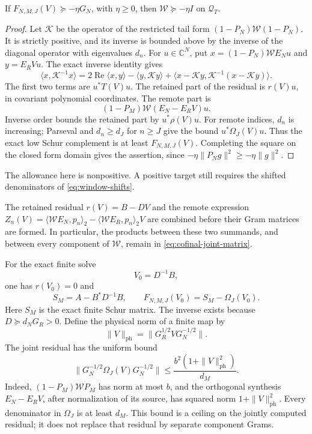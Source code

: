 \begin{proposition}\label{prop:cofinal-joint}
If $F_{N,M,J}(V)\succeq-\eta G_N$, with $\eta\ge0$, then
$\mathcal W\succeq-\eta I$ on $\mathcal Q_T$.
\end{proposition}

\begin{proof}
Let $\mathcal K$ be the operator of the restricted tail form
$(1-P_N)\mathcal W(1-P_N)$.  It is strictly positive, and its inverse
is bounded above by the inverse of the diagonal operator with
eigenvalues $d_n$. For $u\in\mathbb C^N$, put
$x=(1-P_N)\mathcal WE_Nu$ and $y=E_RVu$.
The exact inverse identity gives
\[
 \langle x,\mathcal K^{-1}x\rangle
 =2\operatorname{Re}\langle x,y\rangle-\langle y,\mathcal Ky\rangle
 +\langle x-\mathcal Ky,\mathcal K^{-1}(x-\mathcal Ky)\rangle.
\]
The first two terms are $u^*T(V)u$. The retained part of the
residual is $r(V)u$, in covariant polynomial coordinates.
The remote part is
\[
 (1-P_M)\mathcal W(E_N-E_RV)u.
\]
Inverse order bounds the retained part by $u^*\rho(V)u$.
For remote indices, $d_n$ is increasing; Parseval and
$d_n\ge d_J$ for $n\ge J$ give the bound
$u^*\Omega_J(V)u$.
Thus the exact low Schur complement is at least
$F_{N,M,J}(V)$. Completing the square on the closed form domain
gives the assertion, since
$-\eta\|P_Ng\|^2\ge-\eta\|g\|^2$.
\end{proof}

The allowance here is nonpositive.  A positive target still requires
the shifted denominators of \eqref{eq:window-shifts}.

The retained residual $r(V)=B-DV$ and the remote expression
$Z_n(V)=\langle\mathcal WE_N,p_n\rangle_2-
\langle\mathcal WE_R,p_n\rangle_2 V$ are combined before their
Gram matrices are formed. In particular, the products between
these two summands, and between every component of $\mathcal W$,
remain in \eqref{eq:cofinal-joint-matrix}.

For the exact finite solve
\[
 V_0=D^{-1}B,
\]
one has $r(V_0)=0$ and
\begin{equation}\label{eq:cofinal-exact-solve}
 S_M=A-B^*D^{-1}B,\qquad
 F_{N,M,J}(V_0)=S_M-\Omega_J(V_0).
\end{equation}
Here $S_M$ is the exact finite Schur matrix.  The inverse exists
because $D\succeq d_NG_R>0$.
Define the physical norm of a finite map by
\[
 \|V\|_{\mathrm{ph}}
 =\|G_R^{1/2}VG_N^{-1/2}\|.
\]
The joint residual has the uniform bound
\begin{equation}\label{eq:cofinal-joint-residual-rate}
 \|G_N^{-1/2}\Omega_J(V)G_N^{-1/2}\|
 \le \frac{b^2(1+\|V\|_{\mathrm{ph}}^2)}{d_M}.
\end{equation}
Indeed, $(1-P_M)\mathcal WP_M$ has norm at most $b$, and the
orthogonal synthesis $E_N-E_RV$, after normalization of its
source, has squared norm $1+\|V\|_{\mathrm{ph}}^2$.
Every denominator in $\Omega_J$ is at least $d_M$.
This bound is a ceiling on the jointly computed residual; it
does not replace that residual by separate component Grams.

